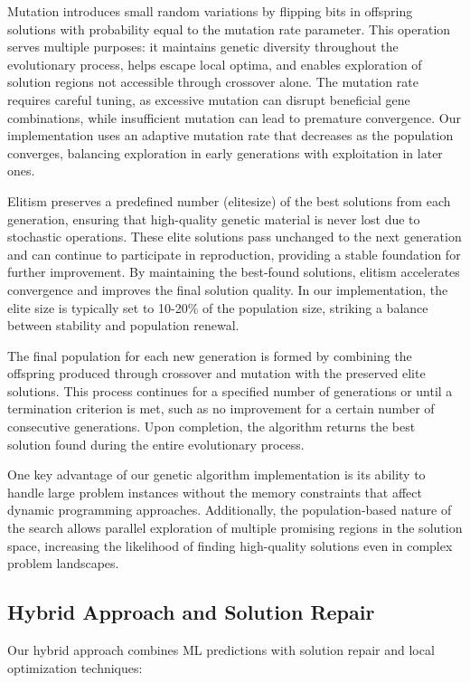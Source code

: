\documentclass[conference, a4paper]{IEEEtran}
\begin{document}
Mutation introduces small random variations by flipping bits in offspring solutions with probability equal to the mutation rate parameter. This operation serves multiple purposes: it maintains genetic diversity throughout the evolutionary process, helps escape local optima, and enables exploration of solution regions not accessible through crossover alone. The mutation rate requires careful tuning, as excessive mutation can disrupt beneficial gene combinations, while insufficient mutation can lead to premature convergence. Our implementation uses an adaptive mutation rate that decreases as the population converges, balancing exploration in early generations with exploitation in later ones.

Elitism preserves a predefined number (elite\textunderscore size) of the best solutions from each generation, ensuring that high-quality genetic material is never lost due to stochastic operations. These elite solutions pass unchanged to the next generation and can continue to participate in reproduction, providing a stable foundation for further improvement. By maintaining the best-found solutions, elitism accelerates convergence and improves the final solution quality. In our implementation, the elite size is typically set to 10-20\% of the population size, striking a balance between stability and population renewal.

The final population for each new generation is formed by combining the offspring produced through crossover and mutation with the preserved elite solutions. This process continues for a specified number of generations or until a termination criterion is met, such as no improvement for a certain number of consecutive generations. Upon completion, the algorithm returns the best solution found during the entire evolutionary process.

One key advantage of our genetic algorithm implementation is its ability to handle large problem instances without the memory constraints that affect dynamic programming approaches. Additionally, the population-based nature of the search allows parallel exploration of multiple promising regions in the solution space, increasing the likelihood of finding high-quality solutions even in complex problem landscapes.

\subsection{Hybrid Approach and Solution Repair}
Our hybrid approach combines ML predictions with solution repair and local optimization techniques:
\end{document}
